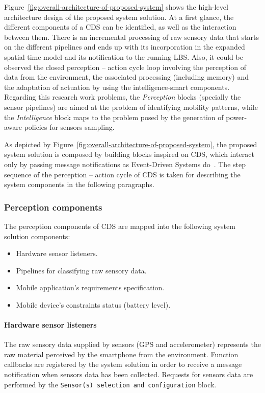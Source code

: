\documentclass[ENG,PhD]{cinvestav}
\begin{document}
Figure~\ref{fig:overall-architecture-of-proposed-system} shows the high-level architecture design of the proposed system solution.
At a first glance, the different components of a CDS can be identified, as well as the interaction between them.
There is an incremental processing of raw sensory data that starts on the different pipelines and ends up with its incorporation in the expanded spatial-time model and its notification to the running LBS.
Also, it could be observed the closed perception -- action cycle loop involving the perception of data from the environment, the associated processing (including memory) and the adaptation of actuation by using the intelligence-smart components.
Regarding this research work problems, the \emph{Perception} blocks (specially the sensor pipelines) are aimed at the problem of identifying mobility patterns, while the \emph{Intelligence} block maps to the problem posed by the generation of power-aware policies for sensors sampling.


As depicted by Figure~\ref{fig:overall-architecture-of-proposed-system}, the proposed system solution is composed by building blocks inspired on CDS, which interact only by passing message notifications as Event-Driven Systems do~\cite{Faison2011,Etzion2011}.
The step sequence of the perception -- action cycle of CDS is taken for describing the system components in the following paragraphs.

\subsubsection{Perception components}
The perception components of CDS are mapped into the following system solution components:
\begin{itemize}
  \item Hardware sensor listeners.
  \item Pipelines for classifying raw sensory data.
  \item Mobile application's requirements specification.
  \item Mobile device's constraints status (battery level).
\end{itemize}

\paragraph*{Hardware sensor listeners}
The raw sensory data supplied by sensors (GPS and accelerometer) represents the raw material perceived by the smartphone from the environment.
Function callbacks are registered by the system solution in order to receive a message notification when sensors data has been collected.
Requests for sensors data are performed by the \texttt{Sensor(s) selection and configuration} block.
\end{document}
